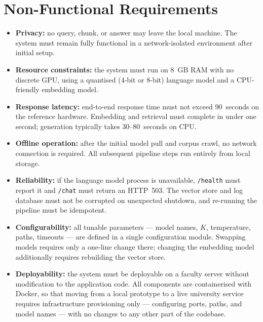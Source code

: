 \section{Non-Functional Requirements}
\label{sec:req-nonfunctional}

\begin{itemize}
    \item[\textbf{R-NF-1}] \textbf{Privacy:} no query, chunk, or answer may leave the
        local machine. The system must remain fully functional in a network-isolated
        environment after initial setup.

    \item[\textbf{R-NF-2}] \textbf{Resource constraints:} the system must run on 8~GB
        RAM with no discrete GPU, using a quantised (4-bit or 8-bit) language model and
        a CPU-friendly embedding model.

    \item[\textbf{R-NF-3}] \textbf{Response latency:} end-to-end response time must
        not exceed 90~seconds on the reference hardware. Embedding and retrieval must
        complete in under one second; generation typically takes 30--80~seconds on CPU.

    \item[\textbf{R-NF-4}] \textbf{Offline operation:} after the initial model pull
        and corpus crawl, no network connection is required. All subsequent pipeline
        steps run entirely from local storage.

    \item[\textbf{R-NF-5}] \textbf{Reliability:} if the language model process is
        unavailable, \texttt{/health} must report it and \texttt{/chat} must return an
        HTTP~503. The vector store and log database must not be corrupted on unexpected
        shutdown, and re-running the pipeline must be idempotent.

    \item[\textbf{R-NF-6}] \textbf{Configurability:} all tunable parameters — model
        names, $K$, temperature, paths, timeouts — are defined in a single
        configuration module. Swapping models requires only a one-line change there;
        changing the embedding model additionally requires rebuilding the vector store.

    \item[\textbf{R-NF-7}] \textbf{Deployability:} the system must be deployable on
        a faculty server without modification to the application code. All components
        are containerised with Docker, so that moving from a local prototype to a live
        university service requires infrastructure provisioning only — configuring
        ports, paths, and model names — with no changes to any other part of the
        codebase.
\end{itemize}